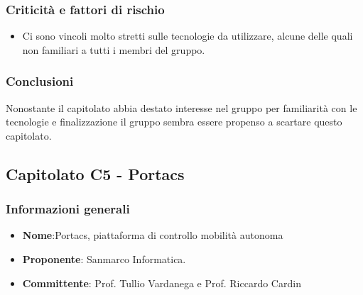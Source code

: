 		\subsubsection{Criticità e fattori di rischio}
			\begin{itemize}
				\item Ci sono vincoli molto stretti sulle tecnologie da utilizzare, alcune delle quali non familiari a tutti i membri del gruppo.
			\end{itemize}
		\subsubsection{Conclusioni}
			Nonostante il capitolato abbia destato interesse nel gruppo per familiarità con le tecnologie e finalizzazione il gruppo sembra essere propenso a scartare questo capitolato.
\newpage
				
				
			
	\subsection{Capitolato C5 - Portacs}
		\subsubsection{Informazioni generali}
			\begin{itemize}
				\item\textbf{Nome}:Portacs, piattaforma di controllo mobilità autonoma
				\item\textbf{Proponente}: Sanmarco Informatica.
				\item\textbf{Committente}: Prof. Tullio Vardanega e Prof. Riccardo Cardin
			\end{itemize}
			
